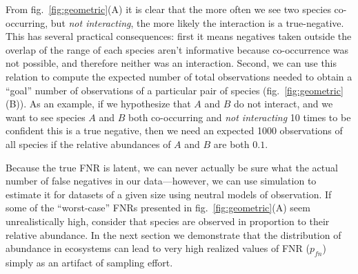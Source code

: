 \documentclass[11pt]{article}
\begin{document}
From fig.~\ref{fig:geometric}(A) it is clear that the more often we see
two species co-occurring, but \emph{not interacting}, the more likely
the interaction is a true-negative. This has several practical
consequences: first it means negatives taken outside the overlap of the
range of each species aren't informative because co-occurrence was not
possible, and therefore neither was an interaction. Second, we can use
this relation to compute the expected number of total observations
needed to obtain a ``goal'' number of observations of a particular pair
of species (fig.~\ref{fig:geometric}(B)). As an example, if we
hypothesize that \(A\) and \(B\) do not interact, and we want to see
species \(A\) and \(B\) both co-occurring and \emph{not interacting} 10
times to be confident this is a true negative, then we need an expected
1000 observations of all species if the relative abundances of \(A\) and
\(B\) are both \(0.1\).

Because the true FNR is latent, we can never actually be sure what the
actual number of false negatives in our data---however, we can use
simulation to estimate it for datasets of a given size using neutral
models of observation. If some of the ``worst-case'' FNRs presented in
fig.~\ref{fig:geometric}(A) seem unrealistically high, consider that
species are observed in proportion to their relative abundance. In the
next section we demonstrate that the distribution of abundance in
ecosystems can lead to very high realized values of FNR (\(p_{fn}\))
simply as an artifact of sampling effort.
\end{document}
